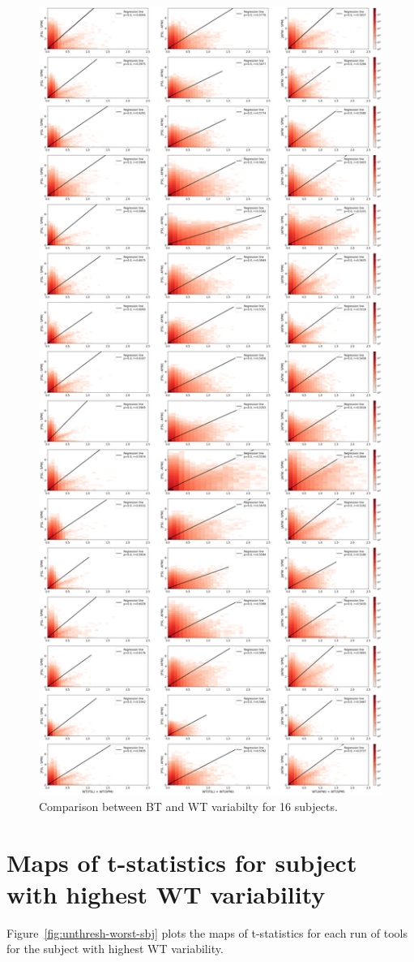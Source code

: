 \documentclass[11pt,onecolumn]{article}
\begin{document}
\begin{figure}[ht]
  \centering
  \includegraphics[width=.55\textwidth]{figures/sbj-abs-corr-unthresh-plot.png}
  \caption{Comparison between BT and WT variabilty for 16 subjects.}
  \label{fig:unthresh-correlation-allsbj}
\end{figure}

\section{Maps of t-statistics for subject with highest WT variability}
\label{sec:supp-worst-subject}

Figure~\ref{fig:unthresh-worst-sbj} plots the maps of t-statistics
for each run of tools for the subject with highest WT variability.
\end{document}
